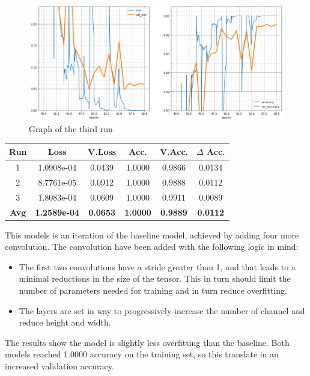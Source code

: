 \begin{figure}[H]
	\begin{center}
	\includegraphics[width=\linewidth]{Immagini/conv-3}
	\caption{Graph of the third run}
	\end{center}
\end{figure}
\begin{table}[H]
	\centering
	\begin{tabular}{cccccc}
		\textbf{Run} &\textbf{Loss}&\textbf{V.Loss} &\textbf{Acc.}&\textbf{V.Acc.}&\textbf{$\Delta$ Acc.} \\ \hline
		1   & 1.0908e-04    &   0.0439  & 1.0000    & 0.9866    & 0.0134 \\
		2   & 8.7761e-05    &   0.0912  & 1.0000    & 0.9888    & 0.0112 \\
		3   & 1.8083e-04    &   0.0609  & 1.0000    & 0.9911    & 0.0089 \\
		\textbf{Avg} & \textbf{1.2589e-04} & \textbf{0.0653}	& \textbf{1.0000}	& \textbf{0.9889} 	& \textbf{0.0112} 
	\end{tabular}
\end{table}

This models is an iteration of the baseline model, achieved by adding four more convolution. The convolution have been added with the following logic in mind:
\begin{itemize}
\item The first two convolutions have a stride greater than 1, and that leads to a minimal reductions in the size of the tensor. This in turn should limit the number of parameters needed for training and in turn reduce overfitting.
\item The layers are set in way to progressively increase the number of channel and reduce height and width.
\end{itemize}
The results show the model is slightly less overfitting than the baseline. Both models reached 1.0000 accuracy on the training set, so this translate in an increased validation accuracy.



